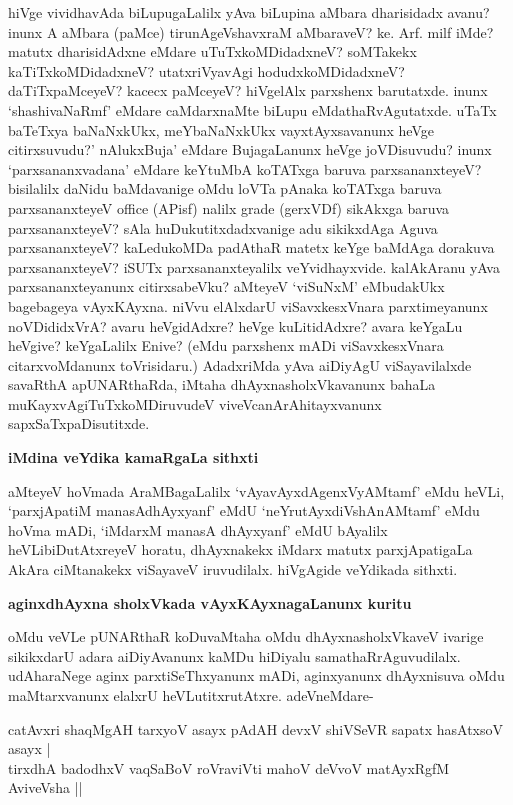 \noindent
hiVge vividhavAda biLupugaLalilx yAva biLupina aMbara dharisidadx avanu? \hbox{inunx} A aMbara (paMce) tirunAgeVshavxraM aMbaraveV? ke. Arf. milf iMde? matutx dharisidAdxne eMdare uTuTxkoMDidadxneV? soMTakekx kaTiTxkoMDidadxneV? utatxriVyavAgi hodudxkoMDidadxneV? daTiTxpaMceyeV? kacecx paMceyeV? hiVgelAlx parxshenx barutatxde. inunx `shashivaNaRmf' eMdare caMdarxnaMte biLupu eMdathaRvAgutatxde. uTaTx baTeTxya baNaNxkUkx, meYbaNaNxkUkx vayxtAyxsavanunx heVge citirxsuvudu?' nAlukxBuja' \hbox{eMdare} BujagaLanunx heVge joVDisuvudu? inunx `parxsananxvadana' eMdare keYtuMbA koTATxga baruva parxsananxteyeV? bisilalilx daNidu baMdavanige oMdu loVTa pAnaka koTATxga baruva parxsananxteyeV {\rm office} (APisf) nalilx {\rm grade} (gerxVDf) sikAkxga baruva parxsananxteyeV? sAla huDukutitxdadxvanige adu sikikxdAga Aguva parxsananxteyeV? kaLedukoMDa padAthaR matetx keYge baMdAga dorakuva parxsananxteyeV? iSUTx parxsananxteyalilx veYvidhayxvide. kalAkAranu yAva parxsananxteyanunx citirxsabeVku? aMteyeV `viSuNxM' eMbudakUkx bagebageya vAyxKAyxna. niVvu elAlxdarU viSavxkesxVnara parxtimeyanunx noVDididxVrA? avaru heVgidAdxre? heVge kuLitidAdxre? avara keYgaLu heVgive? keYgaLalilx Enive? (eMdu parxshenx mADi viSavxkesxVnara citarxvoMdanunx toVrisidaru.) AdadxriMda yAva aiDiyAgU viSayavilalxde savaRthA apUNARthaRda, iMtaha dhAyxnasholxVkavanunx bahaLa muKayxvAgiTuTxkoMDiruvudeV viveVcanArAhitayxvanunx sapxSaTxpaDisutitxde.

{\bigskip
\noindent
{\large\bf iMdina veYdika kamaRgaLa sithxti}}\label{pages208}
\medskip

\noindent
aMteyeV hoVmada AraMBagaLalilx `vAyavAyxdAgenxVyAMtamf'\label{208} eMdu heVLi, `parxjApatiM manasAdhAyxyanf' eMdU `neYrutAyxdiVshAnAMtamf' eMdu hoVma mADi, `iMdarxM manasA dhAyxyanf' eMdU bAyalilx heVLibiDutAtxreyeV horatu, dhAyxnakekx iMdarx matutx parxjApatigaLa AkAra ciMtanakekx viSayaveV iruvudilalx. hiVgAgide veYdikada sithxti.

{\bigskip
\noindent
{\large\bf aginxdhAyxna sholxVkada vAyxKAyxnagaLanunx kuritu }}\label{page208}
\medskip

\noindent
oMdu veVLe pUNARthaR koDuvaMtaha oMdu dhAyxnasholxVkaveV ivarige sikikxdarU adara aiDiyAvanunx kaMDu hiDiyalu samathaRrAguvudilalx. udAharaNege aginx parxtiSeThxyanunx mADi, aginxyanunx dhAyxnisuva oMdu maMtarxvanunx elalxrU heVLutitxrutAtxre. adeVneMdare-

\begin{shloka}
catAvxri shaqMgAH tarxyoV asayx pAdAH devxV shiVSeVR sapatx hasAtxsoV asayx |\\\label{208a}
tirxdhA badodhxV vaqSaBoV roVraviVti mahoV deVvoV matAyxRgfM AviveVsha ||\label{117}
\end{shloka}

